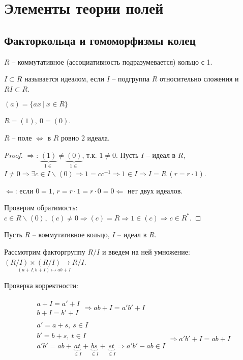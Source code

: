 \documentclass[main]{subfiles}
\begin{document}
\part{ Элементы теории полей}

\chapter{Факторкольца и гомоморфизмы колец}

$R$ -- коммутативное (ассоциативность подразумевается) кольцо с 1. 

$I \subset R$ называется идеалом, если $I$ -- подгруппа $R$ относительно сложения и $RI \subset R$.

$(a) = \{ax \ |\ x \in R\}$

$R = (1), \ 0 = (0)$.

\begin{proposition}
    $R$ -- поле $\Leftrightarrow$ в $R$ ровно 2 идеала.
\end{proposition}

\begin{proof}
    $\Rightarrow$: $\underbrace{(1)}_{1 \in} \neq \underbrace{(0)}_{1 \in}$, т.к. $1 \neq 0$.
    Пусть $I$ -- идеал в $R$, $I \neq 0 \Rightarrow \exists c \in I \backslash \left\langle 0\right\rangle
    \Rightarrow 1 = c c^{-1} \Rightarrow 1 \in I \Rightarrow I = R \ (r = r \cdot 1) $.

    $\Leftarrow$: если $0 = 1$, $r = r \cdot 1 = r \cdot 0 = 0 \Leftarrow$ нет двух идеалов.
    
    Проверим обратимость: $c \in R \backslash \left\langle 0\right\rangle, \ (c) \neq 0 \Rightarrow
    (c) = R \Rightarrow 1 \in (c) \Rightarrow c \in R^*$. 
\end{proof}

Пусть $R$ -- коммутативное кольцо, $I$ -- идеал в $R$.

Рассмотрим факторгруппу $R/I$ и введем на ней умножение: \\ $\underset{(a+I, b+I) \mapsto ab+I}{(R/I)\times(R/I) \rightarrow R/I}$.

Проверка корректности:

\begin{gather*}
    \begin{gathered}
        a + I = a' + I \\
        b + I = b' + I 
    \end{gathered} \Rightarrow ab +I = a'b' +I \\
    \begin{gathered}
        a'= a + s, \ s\in I \\
        b'= b + s, \ t\in I \\
        a'b' = ab + \underbrace{at}_{\in I} + \underbrace{bs}_{\in I} + \underbrace{st}_{\in I}  \Rightarrow a'b' - ab \in I
    \end{gathered} \Rightarrow a'b' + I = ab +I
\end{gather*}
\end{document}
